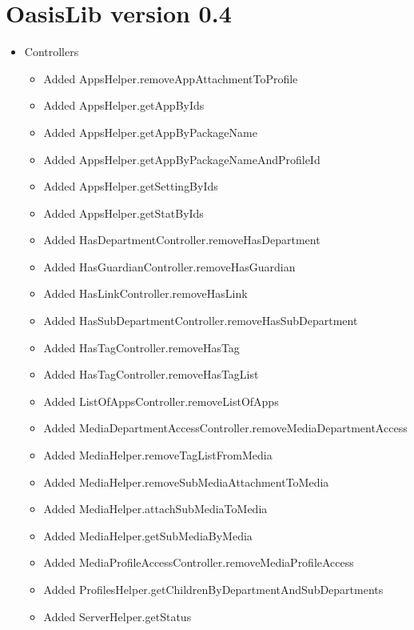 \section{OasisLib version 0.4}
\begin{itemize}
	\item Controllers
	\begin{itemize}
		\item Added AppsHelper.removeAppAttachmentToProfile
		\item Added AppsHelper.getAppByIds
		\item Added AppsHelper.getAppByPackageName
		\item Added AppsHelper.getAppByPackageNameAndProfileId
		\item Added AppsHelper.getSettingByIds
		\item Added AppsHelper.getStatByIds
		\item Added HasDepartmentController.removeHasDepartment
		\item Added HasGuardianController.removeHasGuardian
		\item Added HasLinkController.removeHasLink
		\item Added HasSubDepartmentController.removeHasSubDepartment
		\item Added HasTagController.removeHasTag
		\item Added HasTagController.removeHasTagList
		\item Added ListOfAppsController.removeListOfApps
		\item Added MediaDepartmentAccessController.removeMediaDepartmentAccess
		\item Added MediaHelper.removeTagListFromMedia
		\item Added MediaHelper.removeSubMediaAttachmentToMedia
		\item Added MediaHelper.attachSubMediaToMedia
		\item Added MediaHelper.getSubMediaByMedia
		\item Added MediaProfileAccessController.removeMediaProfileAccess
		\item Added ProfilesHelper.getChildrenByDepartmentAndSubDepartments
		\item Added ServerHelper.getStatus
	\end{itemize}
\end{itemize}

